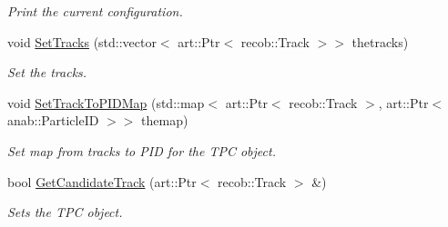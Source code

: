 \begin{DoxyCompactItemize}
\begin{DoxyCompactList}\small\item\em Print the current configuration. \end{DoxyCompactList}\item 
\hypertarget{classubana_1_1MuonCandidateFinder_a1cdd1745117a85bbcfc1de5167c7e688}{void \hyperlink{classubana_1_1MuonCandidateFinder_a1cdd1745117a85bbcfc1de5167c7e688}{Set\-Tracks} (std\-::vector$<$ art\-::\-Ptr$<$ recob\-::\-Track $>$$>$ thetracks)}\label{classubana_1_1MuonCandidateFinder_a1cdd1745117a85bbcfc1de5167c7e688}

\begin{DoxyCompactList}\small\item\em Set the tracks. \end{DoxyCompactList}\item 
\hypertarget{classubana_1_1MuonCandidateFinder_adc3333300fec98b692ff12550c3d8d53}{void \hyperlink{classubana_1_1MuonCandidateFinder_adc3333300fec98b692ff12550c3d8d53}{Set\-Track\-To\-P\-I\-D\-Map} (std\-::map$<$ art\-::\-Ptr$<$ recob\-::\-Track $>$, art\-::\-Ptr$<$ anab\-::\-Particle\-I\-D $>$$>$ themap)}\label{classubana_1_1MuonCandidateFinder_adc3333300fec98b692ff12550c3d8d53}

\begin{DoxyCompactList}\small\item\em Set map from tracks to P\-I\-D for the T\-P\-C object. \end{DoxyCompactList}\item 
\hypertarget{classubana_1_1MuonCandidateFinder_a8f852194c03bf0b3c04650850271c7d9}{bool \hyperlink{classubana_1_1MuonCandidateFinder_a8f852194c03bf0b3c04650850271c7d9}{Get\-Candidate\-Track} (art\-::\-Ptr$<$ recob\-::\-Track $>$ \&)}\label{classubana_1_1MuonCandidateFinder_a8f852194c03bf0b3c04650850271c7d9}

\begin{DoxyCompactList}\small\item\em Sets the T\-P\-C object. \end{DoxyCompactList}\end{DoxyCompactItemize}
